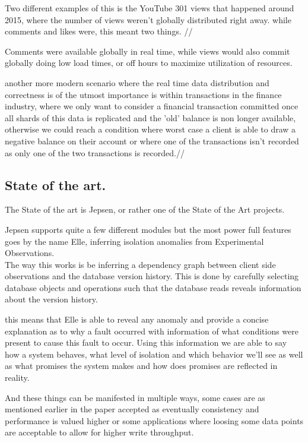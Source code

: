 \documentclass[a4paper,10pt,titlepage]{report}
\begin{document}
Two different examples of this is the YouTube 301 views that happened around 2015, where the number of views weren't globally distributed right away. while comments and likes were, this meant two things. //

Comments were available globally in real time, while views would also commit globally doing low load times, or off hours to maximize utilization of resources.

another more modern scenario where the real time data distribution and correctness is of the utmost importance is within transactions in the finance industry,  where we only want to consider a financial transaction committed once all shards of this data is replicated and the 'old' balance is non longer available, otherwise we could reach a condition where worst case a client is able to draw a negative balance on their account or where one of the transactions isn't recorded as only one of the two transactions is recorded.//


\subsection{State of the art.}

The State of the art is Jepsen, or rather one of the State of the Art projects.

Jepsen supports quite a few different modules but the most power full features goes by the name Elle, inferring isolation anomalies from Experimental Observations. \\

The way this works is be inferring a dependency graph between client side observations and the database version history. This is done by carefully selecting database objects and operations such that the database reads reveals information about the version history.

this means that Elle is able to reveal any anomaly and provide a concise explanation as to why a fault occurred with information of what conditions were present to cause this fault to occur. Using this information we are able to say how a system behaves, what level of isolation and which behavior we'll see as well as what promises the system makes and how does promises are reflected in reality.

And these things can be manifested in multiple ways, some cases are as mentioned earlier in the paper accepted as eventually consistency and performance is valued higher or some applications where loosing some data points are acceptable to allow for higher write throughput.
\end{document}
